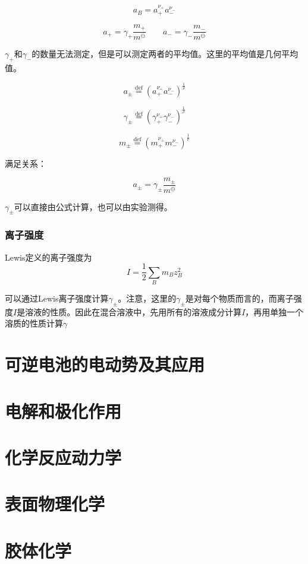 \documentclass[a4paper]{ctexrep}
\begin{document}
    \[
        a_B = a_+^{\nu_+}a_-^{\nu_-}  
    \]

    \[
        a_+ = \gamma_+ \frac{m_+}{m^\ominus}  \qquad a_- = \gamma_-  \frac{m_-}{m^\ominus}  
    \]

    $\gamma_+$和$\gamma_-$的数量无法测定，但是可以测定两者的平均值。这里的平均值是几何平均值。

    \[
        a_\pm \overset{\mathrm{def}}{=} (a_+^{\nu_+}a_-^{\nu_-})^\frac{1}{\nu} 
    \]

    \[
        \gamma_\pm \overset{\mathrm{def}}{=} (\gamma_+^{\nu_+}\gamma_-^{\nu_-})^\frac{1}{\nu}   
    \]

    \[
        m_\pm \overset{\mathrm{def}}{=} (m_+^{\nu_+}m_-^{\nu_-})^\frac{1}{\nu}   
    \]

    满足关系：

    \[
        a_\pm = \gamma_\pm \frac{m_\pm}{m^\ominus}
    \]

    $\gamma_\pm$可以直接由公式计算，也可以由实验测得。

    \subsection{离子强度}

    Lewis定义的离子强度为
    \[
        I = \frac{1}{2} \sum\limits_{B} m_B z_B^2  
    \]

    可以通过Lewis离子强度计算$\gamma_\pm$。注意，这里的$\gamma_\pm$是对每个物质而言的，而离子强度$I$是溶液的性质。因此在混合溶液中，先用所有的溶液成分计算$I$，再用单独一个溶质的性质计算$\gamma$

    \chapter{可逆电池的电动势及其应用}

    \chapter{电解和极化作用}

    \chapter{化学反应动力学}

    \chapter{表面物理化学}

    \chapter{胶体化学}
\end{document}
